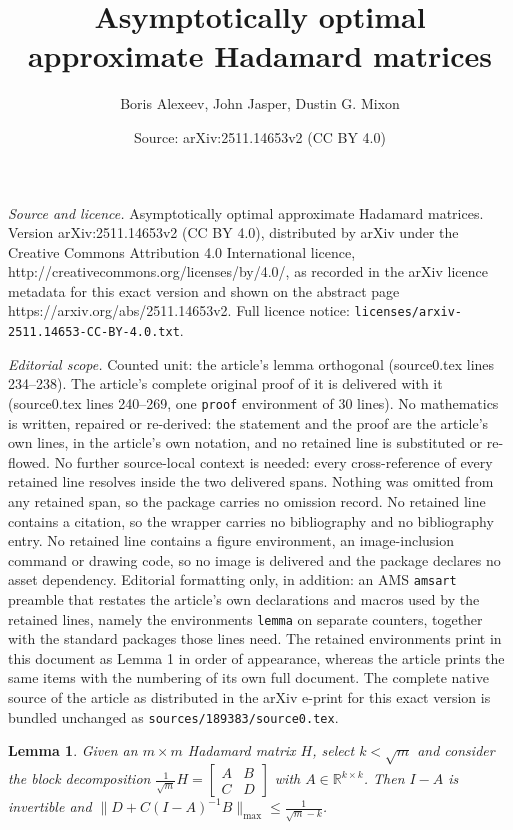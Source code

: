 \documentclass[10pt,a4paper]{amsart}
\title{Asymptotically optimal approximate Hadamard matrices}
\author{Boris Alexeev, John Jasper, Dustin G. Mixon}
\date{Source: arXiv:2511.14653v2 (CC BY 4.0)}
\newtheorem{lemma}{Lemma}
\begin{document}
\maketitle

\noindent\emph{Source and licence.} Asymptotically optimal approximate Hadamard matrices. Version arXiv:2511.14653v2 (CC BY 4.0), distributed by arXiv under the Creative Commons Attribution 4.0 International licence, http://creativecommons.org/licenses/by/4.0/, as recorded in the arXiv licence metadata for this exact version and shown on the abstract page https://arxiv.org/abs/2511.14653v2. Full licence notice: \texttt{licenses/arxiv-2511.14653-CC-BY-4.0.txt}.\par\smallskip

\noindent\textit{Editorial scope.} Counted unit: the article's lemma orthogonal (source0.tex lines 234--238). The article's complete original proof of it is delivered with it (source0.tex lines 240--269, one \texttt{proof} environment of 30 lines). No mathematics is written, repaired or re-derived: the statement and the proof are the article's own lines, in the article's own notation, and no retained line is substituted or re-flowed.  No further source-local context is needed: every cross-reference of every retained line resolves inside the two delivered spans.  Nothing was omitted from any retained span, so the package carries no omission record.  No retained line contains a citation, so the wrapper carries no bibliography and no bibliography entry.  No retained line contains a figure environment, an image-inclusion command or drawing code, so no image is delivered and the package declares no asset dependency.  Editorial formatting only, in addition: an AMS \texttt{amsart} preamble that restates the article's own declarations and macros used by the retained lines, namely the environments \texttt{lemma} on separate counters, together with the standard packages those lines need.  The retained environments print in this document as Lemma 1 in order of appearance, whereas the article prints the same items with the numbering of its own full document.  The complete native source of the article as distributed in the arXiv e-print for this exact version is bundled unchanged as \texttt{sources/189383/source0.tex}.
\begin{lemma}
\label{lem.submatrix is flat orthogonal}
Given an $m\times m$ Hadamard matrix $H$, select $k<\sqrt{m}$ and consider the block decomposition $\frac{1}{\sqrt{m}}H = \left[\begin{smallmatrix} A & B \\ C & D \end{smallmatrix}\right]$ with $A\in\mathbb{R}^{k\times k}$.
Then $I-A$ is invertible and $\|D+C(I-A)^{-1}B\|_{\max}\leq\frac{1}{\sqrt{m}-k}$.
\end{lemma}
\end{document}
